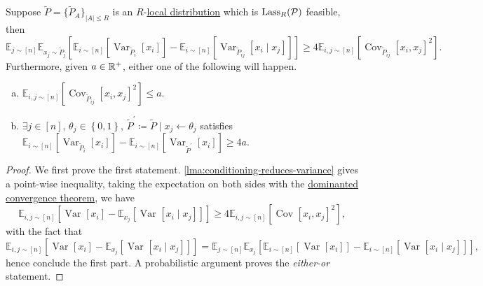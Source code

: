 \begin{corollary}\label{col:lec16}
	Suppose \(\widetilde{P} =\{ \widetilde{P} _A \}_{\left\vert A \right\vert \leq R} \) is an \(R\)-\hyperref[def:local-distribution]{local distribution} which is \(\mathop{\mathrm{Lass}}_R(\mathcal{\MakeUppercase{p}})\) feasible, then
	\[
		\mathbb{E}_{j\sim [n]} \mathbb{E}_{x_j\sim \widetilde{P} _j}\left[ \mathbb{E}_{i\sim [n]}\left[\mathop{\mathrm{Var}}\nolimits_{\widetilde{P} _i}\left[x_i \right]\right] - \mathbb{E}_{i\sim [n]}\left[\mathop{\mathrm{Var}}\nolimits_{\widetilde{P} _{ij}}\left[x_i \mid x_j \right]\right] \right] \geq 4 \mathbb{E}_{i, j\sim [n]}\left[\mathop{\mathrm{Cov}}\nolimits_{\widetilde{P} _{ij}}\left[ x_i, x_j\right]^{2} \right].
	\]
	Furthermore, given \(a\in \mathbb{\MakeUppercase{r}} ^+\), either one of the following will happen.
	\begin{enumerate}[(a)]
		\item \(\mathbb{E}_{i, j\sim [n]}\left[\mathop{\mathrm{Cov}}\nolimits_{\widetilde{P} _{ij}}\left[ x_i, x_j\right]^{2} \right] \leq a\).
		\item \(\exists j\in [n]\), \(\theta _j\in \left\{ 0, 1 \right\} \), \(\widetilde{P} ^\prime \coloneqq \widetilde{P} \mid x_j \gets \theta _j\) satisfies \(\mathbb{E}_{i\sim [n]}\left[\mathop{\mathrm{Var}}\nolimits_{\widetilde{P} _i}\left[x_i \right]\right] - \mathbb{E}_{i\sim [n]}\left[\mathop{\mathrm{Var}}\nolimits_{\widetilde{P}^\prime }\left[x_i \right]\right] \geq 4a\).
	\end{enumerate}
\end{corollary}
\begin{proof}
	We first prove the first statement. \autoref{lma:conditioning-reduces-variance} gives a point-wise inequality, taking the expectation on both sides with the \href{https://en.wikipedia.org/wiki/Dominated_convergence_theorem}{dominanted convergence theorem}, we have
	\[
		\mathbb{E}_{i, j\sim [n]}\left[\mathop{\mathrm{Var}}\nolimits_{}\left[x_i \right] - \mathbb{E}_{x_j}\left[\mathop{\mathrm{Var}}\nolimits_{}\left[x_i \mid x_j \right] \right] \right] \geq 4 \mathbb{E}_{i, j\sim [n]}\left[\mathop{\mathrm{Cov}}\nolimits_{}\left[x_i, x_j \right] ^{2} \right],
	\]
	with the fact that
	\[
		\mathbb{E}_{i, j\sim [n]}\left[\mathop{\mathrm{Var}}\nolimits_{}\left[x_i \right] - \mathbb{E}_{x_j}\left[\mathop{\mathrm{Var}}\nolimits_{}\left[x_i \mid x_j \right] \right] \right] = \mathbb{E}_{j\sim [n]}\mathbb{E}_{x_j}\left[\mathbb{E}_{i\sim [n]}\left[\mathop{\mathrm{Var}}\nolimits_{}\left[x_i \right] \right] - \mathbb{E}_{i\sim [n]}\left[\mathop{\mathrm{Var}}\nolimits_{}\left[x_i\mid x_j \right] \right] \right],
	\]
	hence conclude the first part. A probabilistic argument proves the \emph{either-or} statement.
\end{proof}


